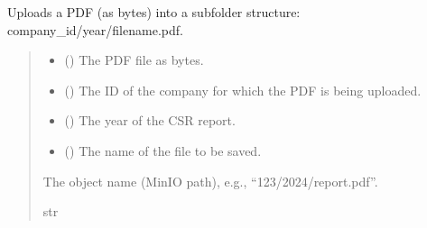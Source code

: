 \documentclass[letterpaper,10pt,english]{sphinxmanual}
\begin{document}
\begin{fulllineitems}
\begin{fulllineitems}
\label{\detokenize{src:src.db_utils.minio.MinioFileSystem.write_pdf_bytes}}
\pysigstartsignatures
{}
\pysigstopsignatures
\sphinxAtStartPar
Uploads a PDF (as bytes) into a subfolder structure: company\_id/year/filename.pdf.
\begin{quote}\begin{description}
\begin{itemize}
\item {} 
\sphinxAtStartPar
{} () \textendash{} The PDF file as bytes.

\item {} 
\sphinxAtStartPar
{} () \textendash{} The ID of the company for which the PDF is being uploaded.

\item {} 
\sphinxAtStartPar
{} () \textendash{} The year of the CSR report.

\item {} 
\sphinxAtStartPar
{} () \textendash{} The name of the file to be saved.

\end{itemize}

\sphinxAtStartPar
The object name (MinIO path), e.g., “123/2024/report.pdf”.

\sphinxAtStartPar
str

\end{description}\end{quote}

\end{fulllineitems}


\end{fulllineitems}
\end{document}
